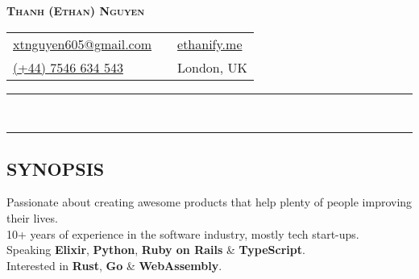 \newcommand{\primary}[1]{\textcolor{primary}{\textbf{#1}}}
\newcommand{\secondary}[1]{\textcolor{secondary}{\textbf{#1}}}
\newcommand{\tertiary}[1]{\textcolor{tertiary}{#1}}

\newcommand{\tbullet}{\textcolor{tertiary}{\textbf{$\bullet$}}\space}
\newcommand{\at}{\textcolor{tertiary}{\textbf{@}}\space}
\newcommand{\then}{\textcolor{tertiary}{$\Rightarrow$}\space}

\newcommand{\keybase}{\textcolor{secondary}{\href{https://keybase.io/ethan605}{\faKey}}}
\newcommand{\github}{\textcolor{secondary}{\href{https://github.com/ethan605}{\faGithub}}}
\newcommand{\linkedin}{\textcolor{secondary}{\href{https://linkedin.com/in/ethan605}{\faLinkedin}}}

\pagestyle{empty}


\setlength\parindent{0pt}
\pagecolor{background}
\color{foreground}

\begin{center}
  \textcolor{primary}{\LARGE\bfseries\scshape{Thanh (Ethan) Nguyen}}
\end{center}

\begin{tabularx}{\textwidth}{
    @{}
    >{\raggedright\arraybackslash}X
    c
    >{\raggedleft\arraybackslash}X
    @{}
  }
  \href{mailto:xtnguyen605@gmail.com}{\textcolor{secondary}{xtnguyen605@gmail.com}} &
    \keybase \space \github \space \linkedin &
    \href{https://ethanify.me}{\textcolor{secondary}{ethanify.me}} \\
  \href{tel:447546634543}{(+44) 7546 634 543} & &
    London, UK \\
\end{tabularx}

\begin{spacing}{0.05}
\rule{\textwidth}{1pt} \\
\rule{\textwidth}{1pt}
\end{spacing}

\subsection*{SYNOPSIS}

Passionate about creating awesome products that help plenty of people improving their lives. \\
10+ years of experience in the software industry, mostly tech start-ups. \\
Speaking \textbf{Elixir}, \textbf{Python}, \textbf{Ruby on Rails} \& \textbf{TypeScript}. \\
Interested in \textbf{Rust}, \textbf{Go} \& \textbf{WebAssembly}.

